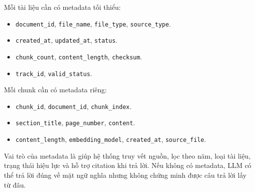 Mỗi tài liệu cần có metadata tối thiểu:

\begin{itemize}
    \item \texttt{document\_id}, \texttt{file\_name}, \texttt{file\_type}, \texttt{source\_type}.
    \item \texttt{created\_at}, \texttt{updated\_at}, \texttt{status}.
    \item \texttt{chunk\_count}, \texttt{content\_length}, \texttt{checksum}.
    \item \texttt{track\_id}, \texttt{valid\_status}.
\end{itemize}

Mỗi chunk cần có metadata riêng:

\begin{itemize}
    \item \texttt{chunk\_id}, \texttt{document\_id}, \texttt{chunk\_index}.
    \item \texttt{section\_title}, \texttt{page\_number}, \texttt{content}.
    \item \texttt{content\_length}, \texttt{embedding\_model}, \texttt{created\_at}, \texttt{source\_file}.
\end{itemize}

Vai trò của metadata là giúp hệ thống truy vết nguồn, lọc theo năm, loại tài liệu, trạng thái hiệu lực và hỗ trợ citation khi trả lời. Nếu không có metadata, LLM có thể trả lời đúng về mặt ngữ nghĩa nhưng không chứng minh được câu trả lời lấy từ đâu.
